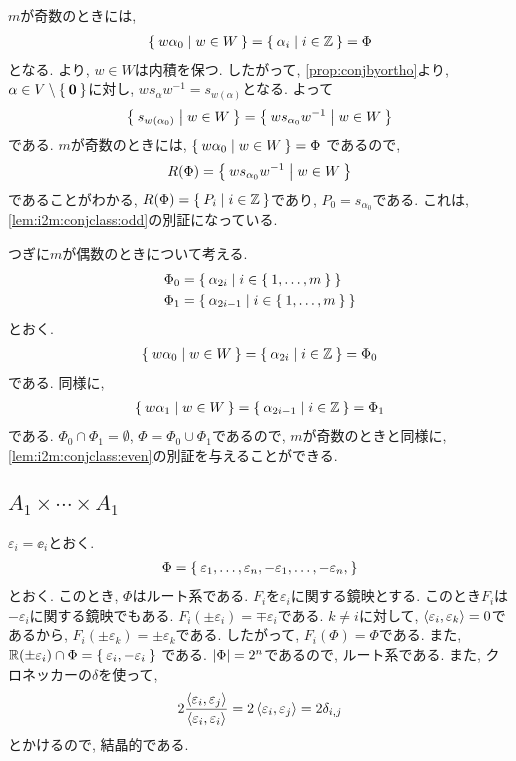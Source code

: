 $m$が奇数のときには,
\begin{align*}
\Set{w\alpha_0 | w\in W} = \Set{\alpha_{i}| i \in \mathbb{Z}}=\Phi
\end{align*}
となる.
より, $w\in W$は内積を保つ.
したがって, \cref{prop:conjbyortho}より,
  $\alpha\in V\setminus\Set{\boldsymbol{0}}$に対し,
$ws_\alpha w^{-1}=s_{w(\alpha)}$となる.
よって
\begin{align*}
\Set{s_{w(\alpha_0)}|w\in W}=\Set{ws_{\alpha_0} w^{-1}|w\in W}
\end{align*}
である.
$m$が奇数のときには,
$\Set{w\alpha_0 | w\in W}=\Phi$
であるので,
\begin{align*}
  R(\Phi)=\Set{ws_{\alpha_0} w^{-1}|w\in W}
\end{align*}
であることがわかる, $R(\Phi)=\Set{P_i|i\in \mathbb{Z}}$であり,
$P_0=s_{\alpha_0}$である.
これは, \cref{lem:i2m:conjclass:odd}の別証になっている.

つぎに$m$が偶数のときについて考える.
\begin{align*}
\Phi_0&=\Set{\alpha_{2i}| i \in \Set{1,\ldots,m}}\\
\Phi_1&=\Set{\alpha_{2i-1}| i \in \Set{1,\ldots,m}}\\
\end{align*}
とおく.
\begin{align*}
 \Set{w\alpha_0 | w\in W}
  = \Set{\alpha_{2i}| i \in \mathbb{Z}}=\Phi_0
\end{align*}
である.
同様に,
\begin{align*}
\Set{w\alpha_1 | w\in W}
  = \Set{\alpha_{2i-1}| i \in \mathbb{Z}}=\Phi_1
\end{align*}
である. $\Phi_0\cap \Phi_1=\emptyset$, $\Phi=\Phi_0\cup \Phi_1$であるので,
$m$が奇数のときと同様に,
\cref{lem:i2m:conjclass:even}の別証を与えることができる.



\subsection{$A_{1}\times\cdots\times A_{1}$}
\label{ex:a1n:root}
$\varepsilon_i=\ee_i$とおく.
\begin{align*}
\Phi=\Set{\varepsilon_1,\ldots,\varepsilon_n,-\varepsilon_1,\ldots,-\varepsilon_n,}
\end{align*}
とおく.  このとき,
$\Phi$はルート系である.
$F_i$を$\varepsilon_i$に関する鏡映とする.
このとき$F_i$は$-\varepsilon_i$に関する鏡映でもある.
$F_i(\pm\varepsilon_i)=\mp\varepsilon_i$である. 
$k\neq i$に対して, $\Braket{\varepsilon_i,\varepsilon_k}=0$であるから,
$F_i(\pm\varepsilon_k)=\pm\varepsilon_k$である.
したがって, $F_i(\Phi)=\Phi$である.
また, $\mathbb{R}(\pm\varepsilon_i)\cap \Phi=\Set{\varepsilon_i,-\varepsilon_i}$
である.
$\left|\Phi\right|=2^n$であるので, ルート系である.
また, クロネッカーの$\delta$を使って,
\begin{align*}
  2\frac{\Braket{\varepsilon_i,\varepsilon_j}}{\Braket{\varepsilon_i,\varepsilon_i}}=2\Braket{\varepsilon_i,\varepsilon_j}=2\delta_{i,j}
\end{align*}
とかけるので, 結晶的である.

